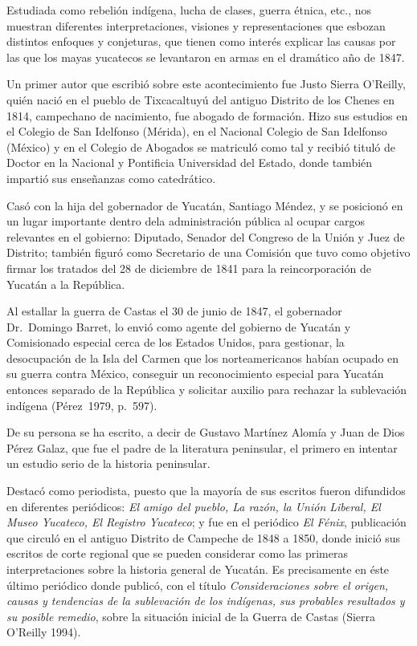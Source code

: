 Estudiada como rebelión indígena, lucha de clases, guerra étnica,  etc.,
nos muestran diferentes interpretaciones, visiones y representaciones que
esbozan distintos enfoques y conjeturas, que tienen como interés explicar
las causas por las que los mayas yucatecos se levantaron en armas en el
dramático año de 1847. 
\enlargethispage{1\baselineskip}

Un primer autor que escribió sobre este acontecimiento fue Justo Sierra
O’Reilly, quién nació en el pueblo de Tixcacaltuyú del antiguo Distrito de
los Chenes en 1814, campechano de nacimiento, fue abogado de formación.
Hizo sus estudios en el Colegio de San Idelfonso (Mérida), en el Nacional
Colegio de San Idelfonso (México) y en el Colegio de Abogados se matriculó
como tal y recibió tituló de Doctor en la Nacional y Pontificia Universidad
del Estado, donde también impartió sus enseñanzas como catedrático.

Casó con la hija del gobernador de Yucatán, Santiago Méndez, y se posicionó
en un lugar importante dentro dela administración pública al ocupar cargos
relevantes en el gobierno: Diputado, Senador del Congreso de la Unión y Juez
de Distrito; también figuró como Secretario de una Comisión que tuvo como
objetivo firmar los tratados del 28 de diciembre de 1841 para la
reincorporación de Yucatán a la República.

Al estallar la guerra de Castas el 30 de junio de 1847, el gobernador Dr.\
Domingo Barret, lo envió como agente del gobierno de Yucatán y Comisionado
especial cerca de los Estados Unidos, para gestionar, la desocupación de la
Isla del Carmen que los norteamericanos habían ocupado en su guerra contra
México, conseguir un reconocimiento especial para Yucatán entonces separado
de la República y solicitar auxilio para rechazar la sublevación indígena
(Pérez~1979, p.~597).
\enlargethispage{-1\baselineskip}

De  su persona se ha escrito, a decir de Gustavo Martínez Alomía y Juan de
Dios Pérez Galaz, que fue el padre de la literatura peninsular, el primero 
en intentar un estudio serio de la historia peninsular.

Destacó como periodista, puesto que la mayoría de sus escritos fueron
difundidos en diferentes periódicos: \textit{El amigo del pueblo, La razón,
la Unión Liberal, El Museo Yucateco, El Registro Yucateco}; y fue en el
periódico \textit{El Fénix}, publicación que circuló en el antiguo Distrito
de Campeche de 1848 a 1850, donde inició sus escritos de corte regional que
se pueden considerar como las primeras interpretaciones sobre la historia
general de Yucatán. Es precisamente en éste último periódico donde 
publicó, con el título \textit{Consideraciones sobre el origen, causas y
tendencias de la sublevación de los indígenas, sus probables resultados y
su posible remedio}, sobre la situación inicial de la Guerra de Castas 
(Sierra O’Reilly 1994).


